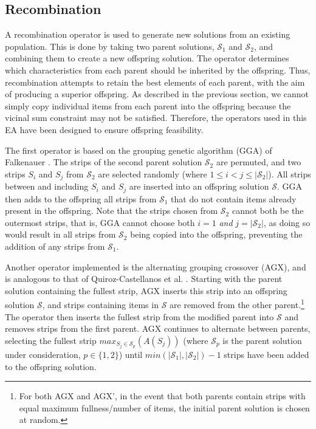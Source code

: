 \documentclass{elsarticle}
\begin{document}
\subsection{Recombination}
\label{sub:xover}
\noindent A recombination operator is used to generate new solutions from an existing population. This is done by taking two parent solutions, $\mathcal{S}_1$ and $\mathcal{S}_2$, and combining them to create a new offspring solution. The operator determines which characteristics from each parent should be inherited by the offspring. Thus, recombination attempts to retain the best elements of each parent, with the aim of producing a superior offspring. As described in the previous section, we cannot simply copy individual items from each parent into the offspring because the vicinal sum constraint may not be satisfied. Therefore, the operators used in this EA have been designed to ensure offspring feasibility.

The first operator is based on the grouping genetic algorithm (GGA) of Falkenauer \cite{falkenauer1992}. The strips of the second parent solution $\mathcal{S}_2$ are permuted, and two strips $S_i$ and $S_j$ from $\mathcal{S}_2$ are selected randomly (where $1 \leq i < j \leq |\mathcal{S}_2|$). All strips between and including $S_i$ and $S_j$ are inserted into an offspring solution $\mathcal{S}$. GGA then adds to the offspring all strips from $\mathcal{S}_1$ that do not contain items already present in the offspring. Note that the strips chosen from $\mathcal{S}_2$ cannot both be the outermost strips, that is, GGA cannot choose both $i = 1$ \emph{and} $j = |\mathcal{S}_2|$, as doing so would result in all strips from $\mathcal{S}_2$ being copied into the offspring, preventing the addition of any strips from $\mathcal{S}_1$. 

Another operator implemented is the alternating grouping crossover (AGX), and is analogous to that of Quiroz-Castellanos et al. \cite{quiroz2015}. Starting with the parent solution containing the fullest strip, AGX inserts this strip into an offspring solution $\mathcal{S}$, and strips containing items in $\mathcal{S}$ are removed from the other parent.\footnote{For both AGX and AGX', in the event that both parents contain strips with equal maximum fullness/number of items, the initial parent solution is chosen at random.} The operator then inserts the fullest strip from the modified parent into $\mathcal{S}$ and removes strips from the first parent. AGX continues to alternate between parents, selecting the fullest strip $max_{S_j \in \mathcal{S}_p} (A(S_j))$ (where $\mathcal{S}_p$ is the parent solution under consideration, $p \in \{1,2\}$) until $min (|\mathcal{S}_1|,|\mathcal{S}_2|) - 1$ strips have been added to the offspring solution. 
\end{document}
